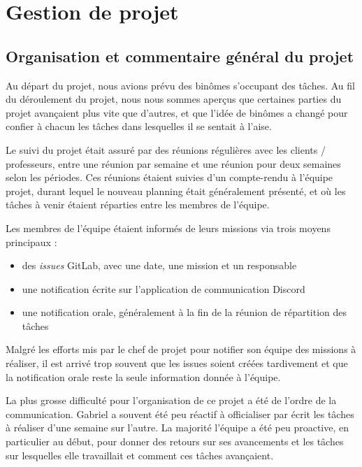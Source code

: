 \chapter{Gestion de projet}


\section{Organisation et commentaire général du projet}

Au départ du projet, nous avions prévu des binômes s'occupant
des tâches. Au fil du déroulement du projet, nous nous sommes
aperçus que certaines parties du projet avançaient plus vite
que d'autres, et que l'idée de binômes a changé pour confier
à chacun les tâches dans lesquelles il se sentait à l'aise.
\newline

Le suivi du projet était assuré par des réunions régulières
avec les clients / professeurs, entre une réunion par semaine
et une réunion pour deux semaines selon les périodes. Ces
réunions étaient suivies d'un compte-rendu à l'équipe projet,
durant lequel le nouveau planning était généralement présenté,
et où les tâches à venir étaient réparties entre les membres
de l'équipe.
\newline

Les membres de l'équipe étaient informés de leurs missions
via trois moyens principaux :
\begin{itemize}
  \item des \textit{issues} GitLab, avec une date, une mission et un responsable
  \item une notification écrite sur l'application de communication Discord
  \item une notification orale, généralement à la fin de la réunion de répartition des tâches
\end{itemize}
Malgré les efforts mis par le chef de projet pour notifier son
équipe des missions à réaliser, il est arrivé trop souvent
que les issues soient créées tardivement et que la
notification orale reste la seule information donnée à
l'équipe.
\newline

La plus grosse difficulté pour l'organisation de ce projet a
été de l'ordre de la communication. Gabriel a souvent été peu
réactif à officialiser par écrit les tâches à réaliser d'une
semaine sur l'autre. La majorité l'équipe a été peu proactive,
en particulier au début, pour donner des retours sur ses
avancements et les tâches sur lesquelles elle travaillait et
comment ces tâches avançaient.

